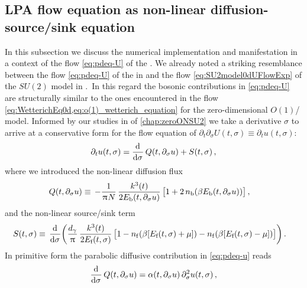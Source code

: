 \subsection{LPA flow equation as non-linear diffusion-source/sink equation}\label{subsec:lpaDSeq}
In this subsection we discuss the numerical implementation and manifestation in a \cfd{} context of the \lpa{} flow \cref{eq:pdeq-U} of the \gnym{}.
We already noted a striking resemblance between the \lpa{} flow \cref{eq:pdeq-U} of the \gnym{} in \dtwo{} and the flow \cref{eq:SU2model0dUFlowExp} of the $SU(2)$ model in \dzero{}.\
In this regard the bosonic contributions in \cref{eq:pdeq-U} are structurally similar to the ones encountered in the flow \cref{eq:WetterichEq0d,eq:o(1)_wetterich_equation} for the zero-dimensional $O(1)$/\ZII{} model.
Informed by our studies in \dzero{} of \cref{chap:zeroONSU2} we take a derivative \wrt{} $\sigma$ to arrive at a conservative form for the flow equation of $\partial_t\partial_\sigma U(t,\sigma)\equiv \partial_t u(t,\sigma)$:
\begin{align}
	\partial_t u(t,\sigma) = \dod{}{\sigma} Q ( t, \partial_\sigma u ) + S ( t, \sigma ) \, ,	\label{eq:pdeq-u}
\end{align}
where we introduced the non-linear diffusion flux
\begin{align}
	Q ( t, \partial_\sigma u ) &\equiv \,  - \frac{1}{\mkern1.0mu\uppi\mkern1.0mu N} \, \frac{k^3 ( t )}{2 E_{\textrm{b}} ( t, \partial_\sigma u )} \, \big[ 1 + 2 \, n_\mathrm{b} ( \beta E_{\textrm{b}} ( t, \partial_\sigma u ) ) \big] \, ,		\label{eq:diffusion_flux}
\end{align}
and the non-linear source/sink term
\begin{align}
	 S ( t, \sigma ) &\equiv \, \dod{}{\sigma}\! \bigg( \frac{d_\gamma}{\piu} \, \frac{k^3 ( t )}{2 E_{\textrm{f}} ( t, \sigma )} \, \big[ 1 - n_\mathrm{f} ( \beta [ E_{\textrm{f}} ( t, \sigma ) + \mu ] ) - n_\mathrm{f} ( \beta [ E_{\textrm{f}} ( t, \sigma ) - \mu ] ) \big] \bigg) \, .\label{eq:source_sink}
\end{align}
In primitive form the parabolic diffusive contribution in \cref{eq:pdeq-u} reads
\begin{align}
	\dod{}{\sigma} Q ( t, \partial_\sigma u ) = \alpha ( t, \partial_\sigma u ) \, \partial_\sigma^2 u ( t, \sigma ) \, ,	\label{eq:heat_equation_analogy}
\end{align}

